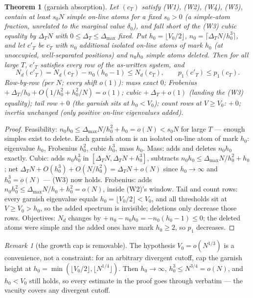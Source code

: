 \documentclass[11pt]{article}
\theoremstyle{plain}
\newtheorem{theorem}{Theorem}[section]
\theoremstyle{definition}
\theoremstyle{remark}
\newtheorem*{remk}{Remark}
\newcommand{\Nd}{N_{d}}
\begin{document}
\begin{theorem}[garnish absorption]
\label{thm:garnish}
Let $(c_T)$ satisfy (W1), (W2), (W4), (W5), contain at least $s_0 N$ simple
on-line atoms for a fixed $s_0 > 0$ (a simple-atom fraction, unrelated to the
marginal value $\delta_0$), and fall short of the (W3) cubic equality by
$\Delta_T N$ with $0 \le \Delta_T \le \Delta_{\max}$ fixed. Put
$h_0 = \lfloor V_0/2 \rfloor$, $n_0 = \lceil \Delta_T N/h_0^3 \rceil$, and let
$c'_T$ be $c_T$ with $n_0$ additional isolated on-line atoms of mark $h_0$ (at
unoccupied, well-separated positions) and $n_0 h_0$ simple atoms deleted. Then
for all large $T$, $c'_T$ satisfies every row of the as-written system, and
\[
  \Nd(c'_T) = \Nd(c_T) - n_0 (h_0 - 1) \le \Nd(c_T),
  \qquad p_1(c'_T) \le p_1(c_T).
\]
Row-by-row (per $N$; every shift $o(1)$): mass exact $0$; Frobenius
$+\ \Delta_T/h_0 + O(1/h_0^2 + h_0^2/N) = o(1)$; cubic $+\ \Delta_T + o(1)$
(landing the (W3) equality); tail row $+\ 0$ (the garnish sits at $h_0 < V_0$);
count rows at $V \ge V_0$: $+\ 0$; inertia unchanged (only positive on-line
eigenvalues added).
\end{theorem}

\begin{proof}
Feasibility: $n_0 h_0 \le \Delta_{\max} N/h_0^2 + h_0 = o(N) < s_0 N$ for large
$T$ --- enough simples exist to delete. Each garnish atom is an isolated on-line
atom of mark $h_0$: eigenvalue $h_0$, Frobenius $h_0^2$, cubic $h_0^3$, mass
$h_0$. Mass: adds and deletes $n_0 h_0$ exactly. Cubic: adds $n_0 h_0^3$ in
$[\Delta_T N, \Delta_T N + h_0^3]$, subtracts
$n_0 h_0 \le \Delta_{\max} N/h_0^2 + h_0$; net
$\Delta_T N + O(h_0^3) + O(N/h_0^2) = \Delta_T N + o(N)$ since
$h_0 \to \infty$ and $h_0^3 = o(N)$ --- (W3) now holds. Frobenius: adds
$n_0 h_0^2 \le \Delta_{\max} N/h_0 + h_0^2 = o(N)$, inside (W2)'s window. Tail
and count rows: every garnish eigenvalue equals $h_0 = \lfloor V_0/2 \rfloor <
V_0$, and all thresholds sit at $V \ge V_0 > h_0$, so the added spectrum is
invisible; deletions only decrease those rows. Objectives: $\Nd$ changes by
$+\,n_0 - n_0 h_0 = -n_0(h_0 - 1) \le 0$; the deleted atoms were simple and the
added ones have mark $h_0 \ge 2$, so $p_1$ decreases.
\end{proof}

\begin{remk}[the growth cap is removable]
The hypothesis $V_0 = o(N^{1/3})$ is a convenience, not a constraint: for an
arbitrary divergent cutoff, cap the garnish height at
$h_0 = \min(\lfloor V_0/2 \rfloor, \lfloor N^{1/4} \rfloor)$. Then
$h_0 \to \infty$, $h_0^3 \le N^{3/4} = o(N)$, and $h_0 < V_0$ still holds, so
every estimate in the proof goes through verbatim --- the vacuity covers any
divergent cutoff.
\end{remk}
\end{document}
